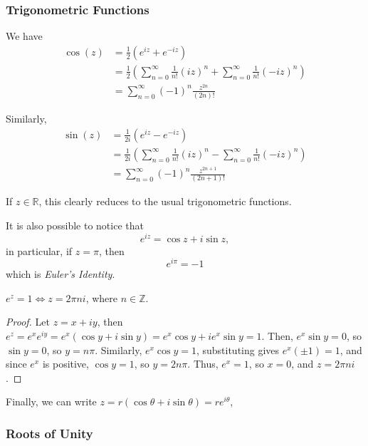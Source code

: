 \documentclass[12pt]{article}
\begin{document}
\subsubsection{Trigonometric Functions}

We have
\begin{align*}
    \cos(z) &= \frac{1}{2}(e^{iz} + e^{-iz}) \\
            &= \frac{1}{2}\left(
            \sum\limits_{n=0}^{\infty}\frac{1}{n!}(iz)^{n}
            +\sum\limits_{n=0}^{\infty}\frac{1}{n!}(-iz)^{n} \right) \\
            &= \sum\limits_{n=0}^{\infty}(-1)^{n}\frac{z^{2n}}{(2n)!}
\end{align*}

Similarly, 
\begin{align*}
    \sin(z) &= \frac{1}{2i}(e^{iz} - e^{-iz}) \\
            &= \frac{1}{2i}\left(
            \sum\limits_{n=0}^{\infty}\frac{1}{n!}(iz)^{n}
            -\sum\limits_{n=0}^{\infty}\frac{1}{n!}(-iz)^{n} \right) \\
            &= \sum\limits_{n=0}^{\infty}(-1)^{n}\frac{z^{2n+1}}{(2n+1)!}
\end{align*}

If $z \in \mathbb{R}$, this clearly reduces to the usual trigonometric functions.

It is also possible to notice that
\[
e^{iz} = \cos z + i\sin z,
\]
in particular, if $z = \pi$, then
\begin{equation*}
    e^{i\pi} = -1
\end{equation*}
which is \emph{Euler's Identity}.

\begin{corollary}
    $e^{z} = 1 \iff z = 2\pi ni$,
    where $n \in \mathbb{Z}$.
\end{corollary}
\begin{proof}
    Let $z = x+iy$, then 
    $e^{z} = e^{x}e^{iy} = e^{x}(\cos y+i\sin y) 
    = e^{x}\cos y + ie^{x} \sin y = 1$.
    Then, $e^{x}\sin y = 0$, so $\sin y = 0$, so $y = n\pi$. 
    Similarly, $e^{x}\cos y = 1$,
    substituting gives $e^{x}(\pm 1) = 1$, 
    and since $e^{x}$ is positive, $\cos y = 1$, 
    so $y = 2n\pi$.
    Thus, $e^{x} = 1$, so $x = 0$, and $z = 2\pi n i$.
\end{proof}

Finally, we can write $z = r(\cos\theta + i\sin\theta) = re^{i\theta }$,

\subsubsection{Roots of Unity}
\end{document}
